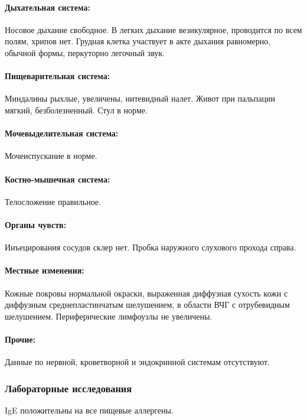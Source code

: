 \documentclass[a4paper,14pt]{extarticle}
\newcommand{\cdate}[2]{\strong{#2 от #1:} }
\begin{document}
\paragraph{Дыхательная система:} Носовое дыхание свободное. В легких дыхание везикулярное, проводится по всем полям, хрипов нет. Грудная клетка участвует в акте дыхания равномерно, обычной формы, перкуторно легочный звук.

\paragraph{Пищеварительная система:} Миндалины рыхлые, увеличены, нитевидный налет. Живот при пальпации мягкий, безболезненный. Стул в норме.

\paragraph{Мочевыделительная система:} Мочеиспускание в норме.

\paragraph{Костно-мышечная система:} Телосложение правильное.

\paragraph{Органы чувств:} Инъецирования сосудов склер нет. Пробка наружного слухового прохода справа.

\paragraph{Местные изменения:} Кожные покровы нормальной окраски, выраженная диффузная сухость кожи с диффузным среднепластинчатым шелушением, в области ВЧГ с отрубевидным шелушением. Периферические лимфоузлы не увеличены.

\paragraph{Прочие:} Данные по нервной, кроветворной и эндокринной системам отсутствуют.

\subsubsection*{Лабораторные исследования}

\cdate{2017}{Аллергопробы} IgE положительны на все пищевые аллергены.
\end{document}
